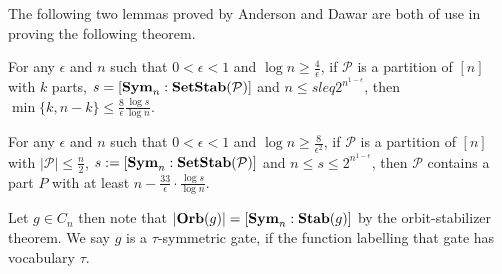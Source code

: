 \documentclass[../paper.tex]{subfiles}
\begin{document}


The following two lemmas proved by Anderson and Dawar \cite{AndersonD17} are
both of use in proving the following theorem.

\begin{lem}
  \label{lem:big-or-small}
  For any $\epsilon$ and $n$ such that $0 < \epsilon < 1$ and $\log n \geq
  \frac{4}{\epsilon}$, if $\mathcal{P}$ is a partition of $[n]$ with $k$ parts,
  $s = [\text{\textbf{Sym}}_n : \text{\textbf{SetStab}} (\mathcal{P})]$ and $n \leq s leq 2^{n^{1-\epsilon}}$,
  then $\min \{k, n-k\} \leq \frac{8}{\epsilon} \frac{\log s}{\log n}$.
\end{lem}

\begin{lem}
  \label{lem:small-means-support}
  For any $\epsilon$ and $n$ such that $0 < \epsilon < 1$ and $\log n \geq
  \frac{8}{\epsilon^2}$, if $\mathcal{P}$ is a partition of $[n]$ with $\vert
  \mathcal{P} \vert \leq \frac{n}{2}$, $s:= [\text{\textbf{Sym}}_n : \text{\textbf{SetStab}} (\mathcal{P})]$
  and $n \leq s \leq 2^{n^{1-\epsilon}}$, then $\mathcal{P}$ contains a part $P$
  with at least $n - \frac{33}{\epsilon} \cdot \frac{\log s} {\log n}$.
\end{lem}

Let $g \in C_n$ then note that $\vert \text{\textbf{Orb}}(g) \vert = [\text{\textbf{Sym}}_n : \text{\textbf{Stab}} (g)]$ by
the orbit-stabilizer theorem. We say $g$ is a $\tau$-symmetric gate, if the
function labelling that gate has vocabulary $\tau$.
\end{document}
